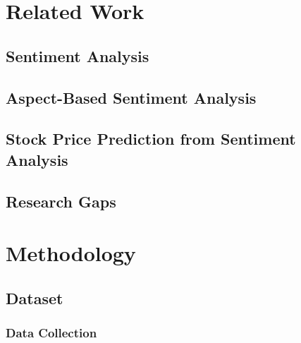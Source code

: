 \chapter{Related Work}
\section{Sentiment Analysis}
\section{Aspect-Based Sentiment Analysis}
\section{Stock Price Prediction from Sentiment Analysis}
\section{Research Gaps}

\chapter{Methodology}

\section{Dataset}

\subsection{Data Collection}